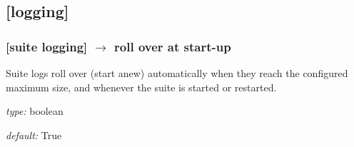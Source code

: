 \subsection{[logging]}

\subsubsection[roll over at start-up]{[suite logging] $\rightarrow$ roll over at start-up}

Suite logs roll over (start anew) automatically when they reach the
configured maximum size, and whenever the suite is started or restarted.

\begin{myitemize}
    \item {\em type:} boolean
    \item {\em default:} True
\end{myitemize}


